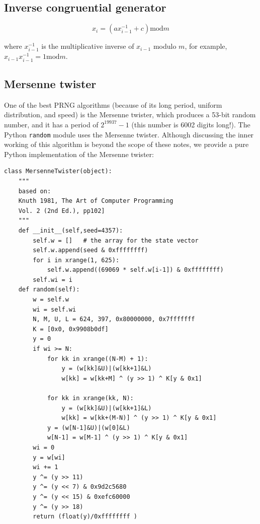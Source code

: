 \documentclass[justified,sixbynine]{tufte-book}
\def\ft{\small\tt}
\theoremstyle{plain}%
\theoremstyle{definition}
\theoremstyle{remark}
\begin{document}
\begin{fullwidth}
\goodbreak\subsection{Inverse congruential generator}

\begin{equation}
x_i=(ax_{i-1}^{-1}+c)\textrm{mod}m
\end{equation}

where $x_{i-1}^{-1}$ is the multiplicative inverse of $x_{i-1}$ modulo $m$,
for example, $x_{i-1}x_{i-1}^{-1}=1\textrm{mod}m$.


\goodbreak\subsection{Mersenne twister}

One of the best PRNG algorithms (because of its long period, uniform distribution, and speed) is the Mersenne twister, which produces a 53-bit random number,
and it has a period of $2^{19937}-1$ (this number is 6002 digits long!).
The Python {\ft random} module uses the Mersenne twister.
Although discussing the inner working of this algorithm is beyond the scope of these notes, we provide a
pure Python implementation of the Mersenne twister:


\begin{lstlisting}[caption={in file: {\ft nlib.py}}]
class MersenneTwister(object):
    """
    based on:
    Knuth 1981, The Art of Computer Programming
    Vol. 2 (2nd Ed.), pp102]
    """
    def __init__(self,seed=4357):
        self.w = []   # the array for the state vector
        self.w.append(seed & 0xffffffff)
        for i in xrange(1, 625):
            self.w.append((69069 * self.w[i-1]) & 0xffffffff)
        self.wi = i
    def random(self):
        w = self.w
        wi = self.wi
        N, M, U, L = 624, 397, 0x80000000, 0x7fffffff
        K = [0x0, 0x9908b0df]
        y = 0
        if wi >= N:
            for kk in xrange((N-M) + 1):
                y = (w[kk]&U)|(w[kk+1]&L)
                w[kk] = w[kk+M] ^ (y >> 1) ^ K[y & 0x1]

            for kk in xrange(kk, N):
                y = (w[kk]&U)|(w[kk+1]&L)
                w[kk] = w[kk+(M-N)] ^ (y >> 1) ^ K[y & 0x1]
            y = (w[N-1]&U)|(w[0]&L)
            w[N-1] = w[M-1] ^ (y >> 1) ^ K[y & 0x1]
        wi = 0
        y = w[wi]
        wi += 1
        y ^= (y >> 11)
        y ^= (y << 7) & 0x9d2c5680
        y ^= (y << 15) & 0xefc60000
        y ^= (y >> 18)
        return (float(y)/0xffffffff )
\end{lstlisting}


\end{fullwidth}
\end{document}
